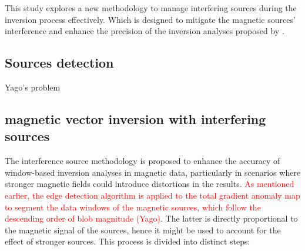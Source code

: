 

This study explores a new methodology to manage interfering sources during the inversion process effectively. Which is designed to mitigate the magnetic sources' interference and enhance the precision of the inversion analyses proposed by \citet{Souza-Junior2023b}.

\subsection{Sources detection}
 Yago's problem

\subsection{magnetic vector inversion with interfering sources}\label{inversion-section}

The interference source methodology is proposed to enhance the accuracy of window-based inversion analyses in magnetic data, particularly in scenarios where stronger magnetic fields could introduce distortions in the results. \textcolor{red}{As mentioned earlier, the edge detection algorithm is applied to the total gradient anomaly map to segment the data windows of the magnetic sources, which follow the descending order of blob magnitude (Yago)}. The latter is directly proportional to the magnetic signal of the sources, hence it might be used to account for the effect of stronger sources. This process is divided into distinct steps:


